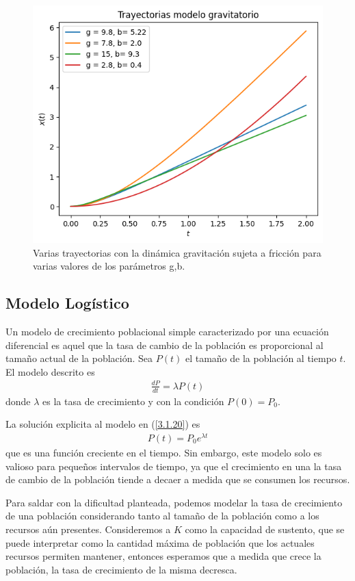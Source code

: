 \begin{figure}
    \centering
    \includegraphics[width = 10 cm]{img/Trayectoria.png}
    \caption{Varias trayectorias con la dinámica gravitación sujeta a fricción para varias valores de los parámetros g,b.}
    \label{fig:trayectoria_gravedad}
\end{figure}

\subsection{Modelo Logístico}

Un modelo de crecimiento poblacional simple caracterizado por una ecuación diferencial es aquel que la tasa de cambio de la población es proporcional al tamaño actual de la población. Sea $P(t)$ el tamaño de la población al tiempo $t$. El modelo descrito es 
\begin{align}
    \frac{dP}{dt} = \lambda P(t)
    \label{3.1.20}
\end{align}
donde $\lambda$ es la tasa de crecimiento y con la condición $P(0) = P_0$. 

La solución explicita al modelo en (\ref{3.1.20}) es
\begin{align}
    P(t) = P_0 e^{\lambda t }
\end{align}
que es una función creciente en el tiempo. Sin embargo, este modelo solo es valioso para pequeños intervalos de tiempo, ya que el crecimiento en una la tasa de cambio de la población tiende a decaer a medida que se consumen los recursos. 

Para saldar con la dificultad planteada, podemos modelar la tasa de crecimiento de una población considerando tanto al tamaño de la población como a los recursos aún presentes. Consideremos a $K$ como la capacidad de sustento, que se puede interpretar como la cantidad máxima de población que los actuales recursos permiten mantener, entonces esperamos que a medida que crece la población, la tasa de crecimiento de la misma decresca.

